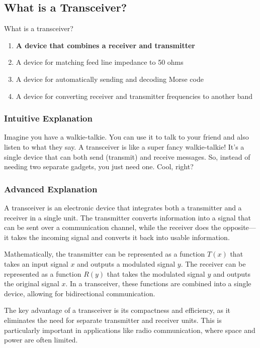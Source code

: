 \subsection{What is a Transceiver?}
\label{T7A02}

\begin{tcolorbox}[colback=gray!10!white,colframe=black!75!black,title=T7A02]
What is a transceiver?
\begin{enumerate}[label=\Alph*)]
    \item \textbf{A device that combines a receiver and transmitter}
    \item A device for matching feed line impedance to 50 ohms
    \item A device for automatically sending and decoding Morse code
    \item A device for converting receiver and transmitter frequencies to another band
\end{enumerate}
\end{tcolorbox}

\subsubsection{Intuitive Explanation}
Imagine you have a walkie-talkie. You can use it to talk to your friend and also listen to what they say. A transceiver is like a super fancy walkie-talkie! It’s a single device that can both send (transmit) and receive messages. So, instead of needing two separate gadgets, you just need one. Cool, right?

\subsubsection{Advanced Explanation}
A transceiver is an electronic device that integrates both a transmitter and a receiver in a single unit. The transmitter converts information into a signal that can be sent over a communication channel, while the receiver does the opposite—it takes the incoming signal and converts it back into usable information. 

Mathematically, the transmitter can be represented as a function \( T(x) \) that takes an input signal \( x \) and outputs a modulated signal \( y \). The receiver can be represented as a function \( R(y) \) that takes the modulated signal \( y \) and outputs the original signal \( x \). In a transceiver, these functions are combined into a single device, allowing for bidirectional communication.

The key advantage of a transceiver is its compactness and efficiency, as it eliminates the need for separate transmitter and receiver units. This is particularly important in applications like radio communication, where space and power are often limited.


